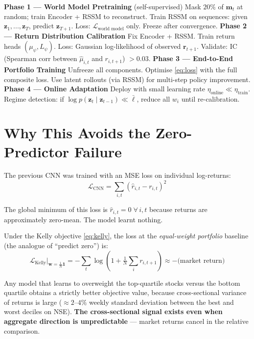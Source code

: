 \documentclass[11pt, a4paper]{article}
\begin{document}
\begin{algorithm}[H]
\caption{Staged Training Protocol}
\begin{algorithmic}[1]
\State \textbf{Phase 1 — World Model Pretraining} (self-supervised)
\State \quad Mask $20\%$ of $\mathbf{m}_t$ at random; train Encoder + RSSM to reconstruct.
\State \quad Train RSSM on sequences: given $\mathbf{z}_1, ..., \mathbf{z}_T$, predict $\mathbf{z}_{T+1}$.
\State \quad Loss: $\mathcal{L}_\text{world model}$ only. Freeze after convergence.
\Statex
\State \textbf{Phase 2 — Return Distribution Calibration}
\State \quad Fix Encoder + RSSM. Train return heads $(\mu_\psi, L_\psi)$.
\State \quad Loss: Gaussian log-likelihood of observed $\mathbf{r}_{t+1}$.
\State \quad Validate: IC (Spearman corr between $\hat{\mu}_{i,t}$ and $r_{i,t+1}$) $> 0.03$.
\Statex
\State \textbf{Phase 3 — End-to-End Portfolio Training}
\State \quad Unfreeze all components. Optimise \eqref{eq:loss} with the full composite loss.
\State \quad Use latent rollouts (via RSSM) for multi-step policy improvement.
\Statex
\State \textbf{Phase 4 — Online Adaptation}
\State \quad Deploy with small learning rate $\eta_\text{online} \ll \eta_\text{train}$.
\State \quad Regime detection: if $\log p(\mathbf{z}_t \mid \mathbf{z}_{t-1}) \ll \bar{\ell}$,
       reduce all $w_i$ until re-calibration.
\end{algorithmic}
\end{algorithm}

\section{Why This Avoids the Zero-Predictor Failure}

The previous CNN was trained with an MSE loss on individual log-returns:
\[
  \mathcal{L}_\text{CNN} = \sum_{i,t} (\hat{r}_{i,t} - r_{i,t})^2
\]

The global minimum of this loss is $\hat{r}_{i,t} = 0\;\forall\, i,t$ because
returns are approximately zero-mean.  The model learnt nothing.

Under the Kelly objective \eqref{eq:kelly}, the loss at the \emph{equal-weight
portfolio} baseline (the analogue of ``predict zero'') is:
\[
  \mathcal{L}_\text{Kelly}\big|_{\mathbf{w} = \tfrac{1}{N}\mathbf{1}}
  = -\sum_t \log\!\left(1 + \tfrac{1}{N}\sum_i r_{i,t+1}\right)
  \approx -\text{(market return)}
\]

Any model that learns to overweight the top-quartile stocks versus
the bottom quartile obtains a strictly better objective value, because
cross-sectional variance of returns is large ($\approx 2$--$4\%$ weekly
standard deviation between the best and worst deciles on NSE).
\textbf{The cross-sectional signal exists even when aggregate direction
is unpredictable} — market returns cancel in the relative comparison.
\end{document}
